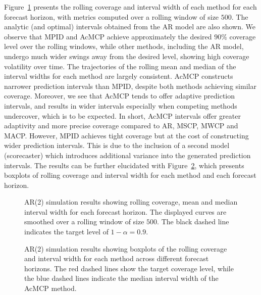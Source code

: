 \documentclass[
  11pt,
  12pt]{article}
\theoremstyle{plain}
\theoremstyle{remark}
\begin{document}
Figure~\ref{fig-AR2_cov} presents the rolling coverage and interval
width of each method for each forecast horizon, with metrics computed
over a rolling window of size \(500\). The analytic (and optimal)
intervals obtained from the AR model are also shown. We observe that
MPID and AcMCP achieve approximately the desired \(90\%\) coverage level
over the rolling windows, while other methods, including the AR model,
undergo much wider swings away from the desired level, showing high
coverage volatility over time. The trajectories of the rolling mean and
median of the interval widths for each method are largely consistent.
AcMCP constructs narrower prediction intervals than MPID, despite both
methods achieving similar coverage. Moreover, we see that AcMCP tends to
offer adaptive prediction intervals, and results in wider intervals
especially when competing methods undercover, which is to be expected.
In short, AcMCP intervals offer greater adaptivity and more precise
coverage compared to AR, MSCP, MWCP and MACP. However, MPID achieves
tight coverage but at the cost of constructing wider prediction
intervals. This is due to the inclusion of a second model (scorecaster)
which introduces additional variance into the generated prediction
intervals. The results can be further elucidated with
Figure~\ref{fig-AR2_box}, which presents boxplots of rolling coverage
and interval width for each method and each forecast horizon.

\begin{figure}


\caption{\label{fig-AR2_cov}AR(2) simulation results showing rolling
coverage, mean and median interval width for each forecast horizon. The
displayed curves are smoothed over a rolling window of size \(500\). The
black dashed line indicates the target level of \(1-\alpha=0.9\).}

\end{figure}%

\begin{figure}


\caption{\label{fig-AR2_box}AR(2) simulation results showing boxplots of
the rolling coverage and interval width for each method across different
forecast horizons. The red dashed lines show the target coverage level,
while the blue dashed lines indicate the median interval width of the
AcMCP method.}

\end{figure}%
\end{document}
